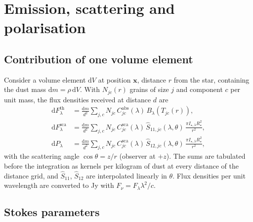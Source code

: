 \documentclass[11pt,a4paper]{article}
\newcommand{\dd}{\mathrm{d}}
\begin{document}
\section{Emission, scattering and polarisation}
\label{sec:rad}

\subsection{Contribution of one volume element}

Consider a volume element $\dd V$ at position $\mathbf{x}$, distance $r$ from the star, containing
the dust mass $\dd m=\rho\,\dd V$. With $N_{jc}(r)$ grains of size $j$ and component $c$ per unit
mass, the flux densities received at distance $d$ are
\begin{align}
\dd F^\mathrm{th}_\lambda &= \frac{\dd m}{d^2}\sum_{j,c} N_{jc}\,C^\mathrm{abs}_{jc}(\lambda)\,
                             B_\lambda\!\left(T_{jc}(r)\right), \label{eq:th}\\
\dd F^\mathrm{sca}_\lambda &= \frac{\dd m}{d^2}\sum_{j,c} N_{jc}\,C^\mathrm{sca}_{jc}(\lambda)\,
                             \hat S_{11,jc}(\lambda,\theta)\,\frac{\pi I_{\star,\lambda}R_\star^2}{r^2},
                             \label{eq:sca}\\
\dd P_\lambda &= \frac{\dd m}{d^2}\sum_{j,c} N_{jc}\,C^\mathrm{sca}_{jc}(\lambda)\,
                             \hat S_{12,jc}(\lambda,\theta)\,\frac{\pi I_{\star,\lambda}R_\star^2}{r^2},
                             \label{eq:pol}
\end{align}
with the scattering angle $\cos\theta=z/r$ (observer at $+z$). The sums are tabulated before the
integration as kernels per kilogram of dust at every distance of the distance grid, and $\hat
S_{11}$, $\hat S_{12}$ are interpolated linearly in $\theta$. Flux densities per unit wavelength
are converted to Jy with $F_\nu=F_\lambda\lambda^2/c$.

\subsection{Stokes parameters}
\end{document}
